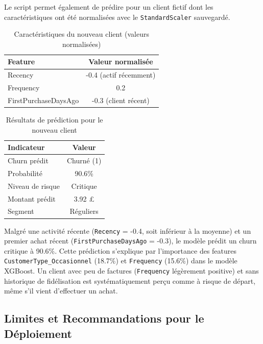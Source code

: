\documentclass[11pt,a4paper]{article}
\begin{document}
Le script permet également de prédire pour un client fictif dont les caractéristiques ont été normalisées avec le \texttt{StandardScaler} sauvegardé.

\begin{table}[H]
	\centering
	\caption{Caractéristiques du nouveau client (valeurs normalisées)}
	\label{tab:new_customer_features}
	\begin{tabular}{|l|c|}
		\hline
		\textbf{Feature} & \textbf{Valeur normalisée} \\
		\hline
		Recency & -0.4 (actif récemment) \\
		Frequency & 0.2 \\
		FirstPurchaseDaysAgo & -0.3 (client récent) \\
		\hline
	\end{tabular}
\end{table}
\begin{table}[H]
	\centering
	\caption{Résultats de prédiction pour le nouveau client}
	\label{tab:new_customer_results}
	\begin{tabular}{|l|c|}
		\hline
		\textbf{Indicateur} & \textbf{Valeur} \\
		\hline
		Churn prédit & Churné (1) \\
		Probabilité & 90.6\% \\
		Niveau de risque & Critique \\
		Montant prédit & 3.92 £ \\
		Segment & Réguliers \\
		\hline
	\end{tabular}
\end{table}
\begin{tcolorbox}[colback=warningred!10, colframe=warningred, title=\textbf{Analyse — Nouveau Client à Risque Critique}]
	Malgré une activité récente (\texttt{Recency} = -0.4, soit inférieur à la moyenne) et un premier achat récent (\texttt{FirstPurchaseDaysAgo} = -0.3), le modèle prédit un churn critique à 90.6\%. Cette prédiction s'explique par l'importance des features \texttt{CustomerType\_Occasionnel} (18.7\%) et \texttt{Frequency} (15.6\%) dans le modèle XGBoost. Un client avec peu de factures (\texttt{Frequency} légèrement positive) et sans historique de fidélisation est systématiquement perçu comme à risque de départ, même s'il vient d'effectuer un achat.
\end{tcolorbox}
\subsection{Limites et Recommandations pour le Déploiement}
\end{document}
